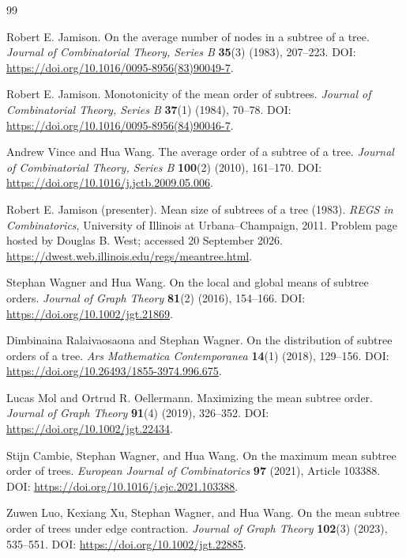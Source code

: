 \documentclass[11pt,letterpaper]{article}
\theoremstyle{plain}
\begin{document}
\clearpage
{}
{}
\begin{thebibliography}{99}
\small
\setlength{\itemsep}{0.65em}

Robert E. Jamison. On the average number of nodes in a subtree of a tree. \emph{Journal of Combinatorial Theory, Series B} \textbf{35}(3) (1983), 207--223.
\newblock DOI: \url{https://doi.org/10.1016/0095-8956(83)90049-7}.

Robert E. Jamison. Monotonicity of the mean order of subtrees. \emph{Journal of Combinatorial Theory, Series B} \textbf{37}(1) (1984), 70--78.
\newblock DOI: \url{https://doi.org/10.1016/0095-8956(84)90046-7}.

Andrew Vince and Hua Wang. The average order of a subtree of a tree. \emph{Journal of Combinatorial Theory, Series B} \textbf{100}(2) (2010), 161--170.
\newblock DOI: \url{https://doi.org/10.1016/j.jctb.2009.05.006}.

Robert E. Jamison (presenter). Mean size of subtrees of a tree (1983). \emph{REGS in Combinatorics}, University of Illinois at Urbana--Champaign, 2011. Problem page hosted by Douglas B. West; accessed 20 September 2026.
\newblock \url{https://dwest.web.illinois.edu/regs/meantree.html}.

Stephan Wagner and Hua Wang. On the local and global means of subtree orders. \emph{Journal of Graph Theory} \textbf{81}(2) (2016), 154--166.
\newblock DOI: \url{https://doi.org/10.1002/jgt.21869}.

Dimbinaina Ralaivaosaona and Stephan Wagner. On the distribution of subtree orders of a tree. \emph{Ars Mathematica Contemporanea} \textbf{14}(1) (2018), 129--156.
\newblock DOI: \url{https://doi.org/10.26493/1855-3974.996.675}.

Lucas Mol and Ortrud R. Oellermann. Maximizing the mean subtree order. \emph{Journal of Graph Theory} \textbf{91}(4) (2019), 326--352.
\newblock DOI: \url{https://doi.org/10.1002/jgt.22434}.

Stijn Cambie, Stephan Wagner, and Hua Wang. On the maximum mean subtree order of trees. \emph{European Journal of Combinatorics} \textbf{97} (2021), Article 103388.
\newblock DOI: \url{https://doi.org/10.1016/j.ejc.2021.103388}.

Zuwen Luo, Kexiang Xu, Stephan Wagner, and Hua Wang. On the mean subtree order of trees under edge contraction. \emph{Journal of Graph Theory} \textbf{102}(3) (2023), 535--551.
\newblock DOI: \url{https://doi.org/10.1002/jgt.22885}.


\end{thebibliography}
\end{document}
